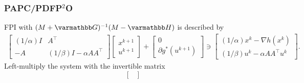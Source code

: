 \documentclass[10pt,mathserif]{beamer}
\begin{document}
\begin{frame}
\frametitle{PAPC/PDFP$^2$O}
FPI with $(M+\opG)^{-1}(M-\opH)$ is described by
\begin{align*}
  \begin{bmatrix}
    (1/\alpha)I & A^\intercal  \\
    -A & (1/\beta)I -\alpha AA^\intercal
  \end{bmatrix}
  \begin{bmatrix}
        x^{k+1} \\
         u ^{k+1}
  \end{bmatrix}
  +
  \begin{bmatrix}
  0\\
  \partial g^*( u ^{k+1})
  \end{bmatrix}
  \ni
  \begin{bmatrix}
  (1/\alpha)x^k-\nabla h(x^k)\\
  (1/\beta) u ^k-\alpha A A^\intercal u ^k
  \end{bmatrix}
  .
\end{align*}
Left-multiply the system with the invertible matrix
\[
\begin{bmatrix}

\end{bmatrix}\]
\end{frame}
\end{document}
